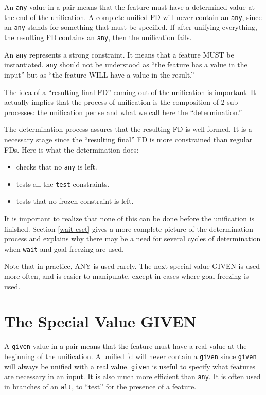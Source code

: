 \documentclass[10pt,a4paper]{report}
\begin{document}
An {\tt any} value in a pair means that the feature must have a
determined value at the end of the unification. A complete
unified FD will never contain an {\tt any}, since an {\tt any} stands
for something that must be specified. If after unifying
everything, the resulting FD contains an {\tt any}, then the
unification fails.

An {\tt any} represents a strong constraint. It means that a feature MUST be
instantiated. {\tt any} should not be understood as ``the feature has a value
in the input'' but as ``the feature WILL have a value in the result.''

The idea of a ``resulting final FD'' coming out of the unification is 
important. It actually implies that the process of unification is the
composition of 2 sub-processes: the unification per se and what we call
here the ``determination.''

The determination process assures that the resulting FD is well formed.  It
is a necessary stage since the ``resulting final'' FD is more constrained
than regular FDs. Here is what the determination does:
\begin{itemize}
\item checks that no {\tt any} is left.

\item tests all the {\tt test} constraints. 

\item tests that no frozen constraint is left. 
\end{itemize}

It is important to realize that none of this can be done before the 
unification is finished.  Section \ref{wait-cset} gives a more complete
picture of the determination process and explains why there may be a need
for several cycles of determination when {\tt wait} and goal freezing are
used. 

Note that in practice, ANY is used rarely.  The next special value GIVEN is
used more often, and is easier to manipulate, except in cases where goal
freezing is used.


\section{The Special Value GIVEN}

A {\tt given} value in a pair means that the feature must have a real value
at the beginning of the unification.  A unified fd will never contain a
{\tt given} since {\tt given} will always be unified with a real value.
{\tt given} is useful to specify what features are necessary in an input.  It
is also much more efficient than {\tt any}.  It is often used in branches of
an {\tt alt}, to ``test'' for the presence of a feature.
\end{document}
